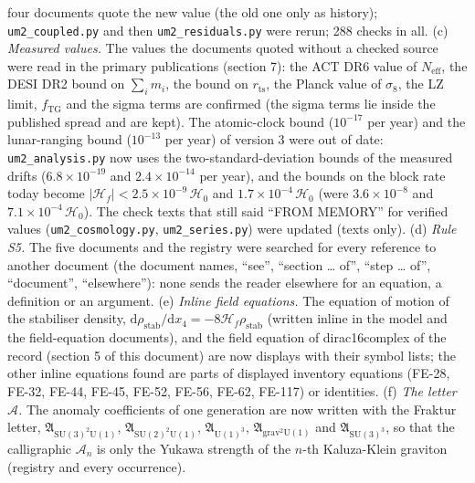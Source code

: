 \documentclass[
  10pt,
]{article}
\begin{document}
\begin{enumerate}
  four documents quote the new value (the old one only as history);
  \texttt{um2\_coupled.py} and then \texttt{um2\_residuals.py} were
  rerun; 288 checks in all. (c) \emph{Measured values.} The values the
  documents quoted without a checked source were read in the primary
  publications (section 7): the ACT DR6 value of \(N_{\mathrm{eff}}\),
  the DESI DR2 bound on \(\sum_im_i\), the bound on \(r_{\mathrm{ts}}\),
  the Planck value of \(\sigma_8\), the LZ limit, \(f_{\mathrm{TG}}\)
  and the sigma terms are confirmed (the sigma terms lie inside the
  published spread and are kept). The atomic-clock bound (\(10^{-17}\)
  per year) and the lunar-ranging bound (\(10^{-13}\) per year) of
  version 3 were out of date: \texttt{um2\_analysis.py} now uses the
  two-standard-deviation bounds of the measured drifts
  (\(6.8\times10^{-19}\) and \(2.4\times10^{-14}\) per year), and the
  bounds on the block rate today become
  \(\lvert\mathcal{H}_f\rvert < 2.5\times10^{-9}\,\mathcal{H}_0\) and
  \(1.7\times10^{-4}\,\mathcal{H}_0\) (were \(3.6\times10^{-8}\) and
  \(7.1\times10^{-4}\,\mathcal{H}_0\)). The check texts that still said
  ``FROM MEMORY'' for verified values (\texttt{um2\_cosmology.py},
  \texttt{um2\_series.py}) were updated (texts only). (d) \emph{Rule
  S5.} The five documents and the registry were searched for every
  reference to another document (the document names, ``see'', ``section
  \ldots{} of'', ``step \ldots{} of'', ``document'', ``elsewhere''):
  none sends the reader elsewhere for an equation, a definition or an
  argument. (e) \emph{Inline field equations.} The equation of motion of
  the stabiliser density,
  \(\mathrm{d}\rho_{\mathrm{stab}}/\mathrm{d}x_4 = -8\mathcal{H}_f\rho_{\mathrm{stab}}\)
  (written inline in the model and the field-equation documents), and
  the field equation of dirac16complex of the record (section 5 of this
  document) are now displays with their symbol lists; the other inline
  equations found are parts of displayed inventory equations (FE-28,
  FE-32, FE-44, FE-45, FE-52, FE-56, FE-62, FE-117) or identities. (f)
  \emph{The letter \(\mathcal{A}\).} The anomaly coefficients of one
  generation are now written with the Fraktur letter,
  \(\mathfrak{A}_{\mathrm{SU(3)^2U(1)}}\),
  \(\mathfrak{A}_{\mathrm{SU(2)^2U(1)}}\),
  \(\mathfrak{A}_{\mathrm{U(1)^3}}\),
  \(\mathfrak{A}_{\mathrm{grav^2U(1)}}\) and
  \(\mathfrak{A}_{\mathrm{SU(3)^3}}\), so that the calligraphic
  \(\mathcal{A}_n\) is only the Yukawa strength of the \(n\)-th
  Kaluza-Klein graviton (registry and every occurrence).
\end{enumerate}
\end{document}
